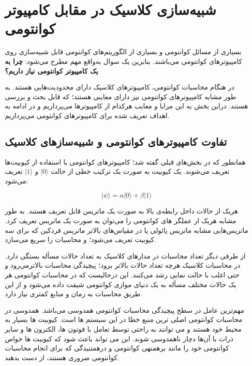 \documentclass{book}
\begin{document}
\section{شبیه‌سازی کلاسیک در مقابل کامپیوتر کوانتومی}

بسیاری از مسائل کوانتومی و بسیاری از الگوریتم‌های کوانتومی قابل شبیه‌سازی روی کامپیوتر‌های کوانتومی می‌باشند. بنابرین یک سوال به‌واقع مهم مطرح می‌شود: \textbf{چرا به یک کامپیوتر کوانتومی نیاز داریم؟}

در هنگام محاسبات کوانتومی،‌ کامپیوتر‌های کلاسیک دارای محدودیت‌هایی هستند. به طور مشابه کامپیوتر‌های کوانتومی نیز دارای معایبی هستند؛ که قابل بحث و بررسی هستند. دراین بخش به این مزایا و معایب هرکدام از کامپیوترها می‌پردازیم و در ادامه به اهداف تعریف شده برای کامپیوترهای کوانتومی می‌پردازیم.


\subsection{تفاوت کامپیوترهای کوانتومی و شبیه‌سازهای کلاسیک}
همانطور که در بخش‌های قبلی گفته شد؛ کامپیوترهای کوانتومی با استفاده از کیوبیت‌ها تعریف می‌شوند. یک کیوبیت به صورت یک ترکیب خطی از حالت $\vert0\rangle$ و $\vert1\rangle$ تعریف می‌شود:

\begin{center}
\begin{equation}
\vert\psi\rangle = \alpha\vert0\rangle + \beta\vert1\rangle
\end{equation}
\end{center}

هریک از حالات داخل رابطه‌ی بالا به صورت یک ماتریس قابل تعریف هستند. به طور مشابه هریک از عملگر های کوانتومی را می‌توان به صورت یک ماتریس تعریف کرد. ماتریس‌هایی مشابه ماتریس پائولی یا در مقیاس‌های بالاتر ماتریس فردکین که برای سه کیوبیت تعریف می‌شود؛ و محاسبات را سریع می‌سازد.



از طرفی دیگر تعداد محاسبات در مدار‌های کلاسیک به تعداد حالات مسأله بستگی دارد. در محاسبات کلاسیک هرچه تعداد حالات بالاتر برود؛ پیچیدگی محاسبات بالاتر‌می‌رود و حتی اغلب با حالت نمایی رشد می‌کنند. این درحالیست که در محاسبات کوانتومی هر یک حالات مختلف مسأله به یک دنیای موازی کوانتومی شیفت داده می‌شود و از این طریق محاسبات به زمان و منابع کمتری نیاز دارد.


مهم‌ترین عامل در سطح پیچیدگی محاسبات کوانتومی همدوسی می‌باشد. 
همدوسی در محاسبات کوانتومی اصلی ترین منبع خطا در این سیستم ها است. کیوبیت ها بسیار به محیط خود هستند و می توانند به راحتی توسط  تعامل با فوتون ها، الکترون ها و سایر ذرات با آن‌ها دچار ناهمدوسی شوند. این می تواند باعث شود که کیوبیت ها خواص کوانتومی خود را مانند برهمنهی کوانتومی و درهمتنیدگی که برای انجام محاسبات کوانتومی ضروری هستند، از دست بدهند.
\end{document}
